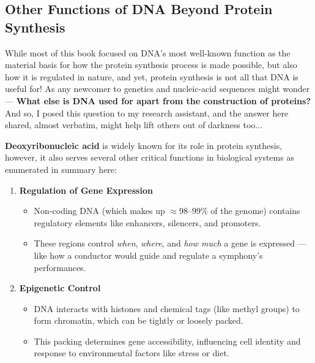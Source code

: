 \documentclass[a4paper, 18pt]{book} %
\begin{document}
\begin{appendices}


\chapter{Other Functions of DNA Beyond Protein Synthesis}
\label{APPOTHERFUNC}


While most of this book focused on DNA's most well-known function as the material basis for how the protein synthesis process is made possible, but also how it is regulated in nature, and yet, protein synthesis is not all that DNA is useful for! As any newcomer to genetics and nucleic-acid sequences might wonder --- \textbf{What else is DNA used for apart from the construction of proteins?} And so, I posed this question to my research assistant\cite{copilot_dna_assistant}, and the answer here shared, almost verbatim, might help lift others out of darkness too...


\vspace{2em}

\textbf{Deoxyribonucleic acid} is widely known for its role in protein synthesis, however, it also serves several other critical functions in biological systems as enumerated in summary here:

\begin{enumerate}
    \item{ \textbf{Regulation of Gene Expression\cite{alberts2002molecular}} 
    

	\begin{itemize}
	\item Non-coding DNA (which makes up $\approx 98–99$\% of the genome) contains regulatory elements like enhancers, silencers, and promoters.
	\item These regions control \textit{when}, \textit{where}, and \textit{how much} a gene is expressed --- like how a conductor would guide and regulate a symphony's performances.
	\end{itemize}	    
    
    }

    \item{ \textbf{Epigenetic Control\cite{bird2007perceptions}} 

\begin{itemize}
	\item DNA interacts with histones and chemical tags (like methyl groups) to form chromatin, which can be tightly or loosely packed.
	\item This packing determines gene accessibility, influencing cell identity and response to environmental factors like stress or diet.
	\end{itemize}	    
    
}
\end{enumerate}
\end{appendices}
\end{document}
